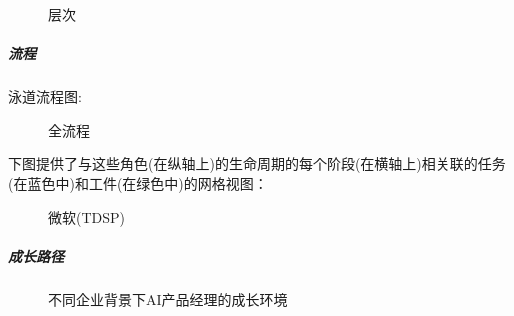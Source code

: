 \documentclass[letterpaper,11pt,english]{sphinxmanual}
\begin{document}
\begin{figure}[H]
\centering
\capstart

\noindent{}
\caption{层次 \sphinxfootnotemark[250]}\label{\detokenize{chapter_introduction/AI_PM:id61}}\end{figure}
%
\begin{footnotetext}[250]\sphinxAtStartFootnote
{}
%
\end{footnotetext}\ignorespaces 

\subparagraph{流程}
\label{\detokenize{chapter_introduction/AI_PM:id24}}
泳道流程图:

\begin{figure}[H]
\centering
\capstart

\noindent{}
\caption{全流程}\label{\detokenize{chapter_introduction/AI_PM:id62}}\end{figure}

下图提供了与这些角色(在纵轴上)的生命周期的每个阶段(在横轴上)相关联的任务(在蓝色中)和工件(在绿色中)的网格视图：

\begin{figure}[H]
\centering
\capstart

\noindent{}
\caption{微软(TDSP)}\label{\detokenize{chapter_introduction/AI_PM:id63}}\end{figure}


\subparagraph{成长路径}
\label{\detokenize{chapter_introduction/AI_PM:id25}}
\begin{figure}[H]
\centering
\capstart

\noindent{}
\caption{不同企业背景下AI产品经理的成长环境\sphinxfootnotemark[251]}\label{\detokenize{chapter_introduction/AI_PM:id64}}\end{figure}
%
\begin{footnotetext}[251]\sphinxAtStartFootnote
{}
%
\end{footnotetext}\ignorespaces 
\end{document}
